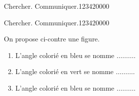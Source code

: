 \begin{pageAD}
\begin{ExoCad}{Chercher. Communiquer.}{1234}{2}{0}{0}{0}{0}
\begin{minipage}{0.5\linewidth}
\end{minipage}

\end{ExoCad}
\begin{ExoCad}{Chercher. Communiquer.}{1234}{2}{0}{0}{0}{0}
 

\begin{minipage}{0.6\linewidth}
On propose ci-contre une figure.
\begin{enumerate}
\item L'angle colorié en bleu se nomme $\ldots\ldots\ldots$.\vspace{0.3cm}
\item L'angle colorié en vert se nomme $\ldots\ldots\ldots$.\vspace{0.3cm}
\item L'angle colorié en bleu se nomme $\ldots\ldots\ldots$.\vspace{0.3cm}
\end{enumerate}

\end{minipage}
\begin{minipage}{0.4\linewidth}


\end{minipage}
\end{ExoCad}
\end{pageAD}
